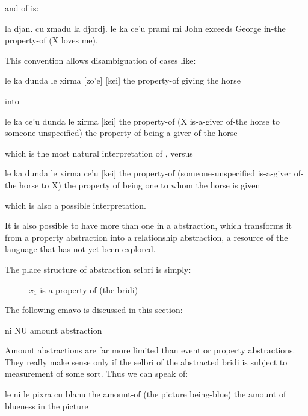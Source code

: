 {\noindent}and of  is:
\begin{example}
la djan. cu zmadu la djordj. le ka ce'u prami mi\n
John exceeds George in-the property-of (X loves me).
\end{example}

This convention allows disambiguation of cases like:
\begin{example}
le ka  dunda le xirma [zo'e] [kei]\n
the property-of giving the horse
\end{example}

{\noindent}into
\begin{example}
le ka ce'u dunda le xirma\n
\T	{} [kei]\n
the property-of (X is-a-giver of-the horse\n
\T	to someone-unspecified)\n
the property of being a giver of the horse
\end{example}

{\noindent}which is the most natural interpretation of , versus
\begin{example}
le ka  dunda\n
\T	le xirma ce'u [kei]\n
the property-of (someone-unspecified\n
\T	is-a-giver of-the horse to X)\n
the property of being one to whom the horse is given
\end{example}

{\noindent}which is also a possible interpretation. 

It is also possible to have more than one  in a
     abstraction, which transforms it from a property
    abstraction into a relationship abstraction, a resource of the
    language that has not yet been explored.

The place structure of  abstraction selbri is
    simply:
\begin{description}
\item[] $x_1$ is a property of (the bridi)
\end{description}



The following cmavo is discussed in this section:

   ni  NU  amount abstraction

Amount abstractions are far more limited than event or
    property abstractions. They really make sense only if the
    selbri of the abstracted bridi is subject to measurement of
    some sort. Thus we can speak of:
\begin{example}
le ni le pixra cu blanu \n
the amount-of (the picture being-blue)\n
the amount of blueness in the picture
\end{example}

